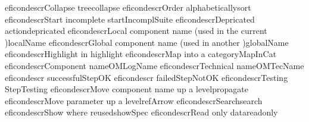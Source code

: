 \begin{gdreficon}
  \app{}eficondescr{Collapse tree}{collapse}
  \app{}eficondescr{Order alphabetically}{sort}
  \app{}eficondescr{Start incomplete \gdsuite{}}{startIncomplSuite}
  \app{}eficondescr{Depricated action}{depricated}
  \app{}eficondescr{Local component name (used in the current \gdcase{})}{localName}
  \app{}eficondescr{Global component name (used in another \gdcase{})}{globalName}
  \app{}eficondescr{Highlight in \gdaut{}}{highlight}
  \app{}eficondescr{Map into a category}{MapInCat}
  \app{}eficondescr{Component name}{OMLogName}
  \app{}eficondescr{Technical name}{OMTecName}
  \app{}eficondescr{\gdstep{} successful}{StepOK}
  \app{}eficondescr{\gdstep{} failed}{StepNotOK}
  \app{}eficondescr{Testing \gdstep{}}{StepTesting}
  \app{}eficondescr{Move component name up a level}{propagate}
  \app{}eficondescr{Move parameter up a level}{refArrow}
  \app{}eficondescr{Search}{search}
  \app{}eficondescr{Show where reused}{showSpec}
  \app{}eficondescr{Read only data}{readonly}
\end{gdreficon}
